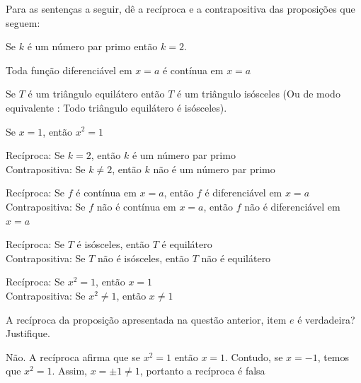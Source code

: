 \begin{exercises*}
\begin{exercise}
  Para as sentenças a seguir, dê a recíproca e a contrapositiva das
  proposições que seguem:
  \begin{alphalist}
    \item Se $k$ é um número par primo então $k=2$.
    \item Toda função diferenciável em $x=a$ é contínua em $x=a$
    \item Se $T$ é um triângulo equilátero então $T$ é um triângulo
      isósceles (Ou de modo equivalente : Todo triângulo equilátero é
      isósceles).
    \item Se $x=1$, então $x^2=1$
  \end{alphalist}

  \begin{answer}
    \begin{alphalist}
      \item Recíproca: Se $k=2$, então $k$ é um número par primo \\
        Contrapositiva: Se $k \neq 2$, então $k$ não é um número par primo
      \item Recíproca: Se $f$ é contínua em $x=a$,
        então $f$ é diferenciável em $x=a$ \\
        Contrapositiva: Se $f$ não é contínua em $x=a$,
        então $f$ não é diferenciável em $x=a$
      \item Recíproca: Se $T$ é isósceles, então $T$ é equilátero \\
        Contrapositiva: Se $T$ não é isósceles, então $T$ não é equilátero
      \item Recíproca: Se $x^2=1$, então $x=1$ \\
        Contrapositiva: Se $x^2 \neq 1$, então $x \neq 1$
    \end{alphalist}
  \end{answer}
\end{exercise}

\begin{exercise}
  A recíproca da proposição apresentada na questão anterior, item $e$ é
  verdadeira? Justifique.

  \begin{answer}
    Não. A recíproca afirma que se $x^2=1$ então $x=1$.
    Contudo, se $x = -1$, temos que $x^2 = 1$.
    Assim,  $x=\pm 1 \neq 1$, portanto a recíproca é falsa
  \end{answer}
\end{exercise}



\end{exercises*}
